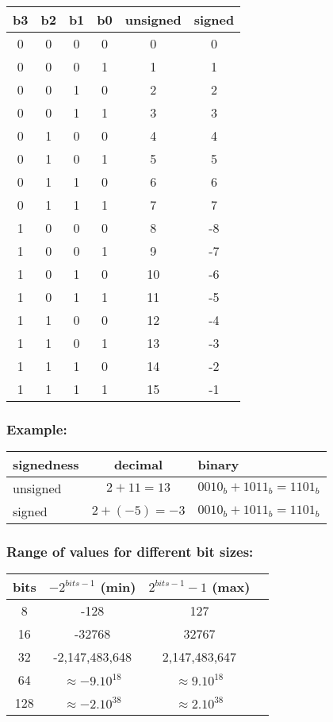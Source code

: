 \documentclass[12pt]{article}
\begin{document}
\begin{tabular}{cccccc}
b3 & b2 & b1 & b0 & unsigned & signed \\
\hline
0 & 0 & 0 & 0 & 0 & 0 \\
0 & 0 & 0 & 1 & 1 & 1 \\
0 & 0 & 1 & 0 & 2 & 2 \\
0 & 0 & 1 & 1 & 3 & 3 \\
0 & 1 & 0 & 0 & 4 & 4 \\
0 & 1 & 0 & 1 & 5 & 5 \\
0 & 1 & 1 & 0 & 6 & 6 \\
0 & 1 & 1 & 1 & 7 & 7 \\
1 & 0 & 0 & 0 & 8 & -8 \\
1 & 0 & 0 & 1 & 9 & -7 \\
1 & 0 & 1 & 0 & 10 & -6 \\
1 & 0 & 1 & 1 & 11 & -5 \\
1 & 1 & 0 & 0 & 12 & -4 \\
1 & 1 & 0 & 1 & 13 & -3 \\
1 & 1 & 1 & 0 & 14 & -2 \\
1 & 1 & 1 & 1 & 15 & -1 \\
\end{tabular}

\subsubsection{Example:}

\begin{tabular}{lcl}
signedness & decimal & binary \\
\hline
unsigned & $2 + 11 = 13$ & $0010_b + 1011_b = 1101_b$ \\
signed & $2 + (-5) = -3$ & $0010_b + 1011_b = 1101_b$ 
\end{tabular}

\subsubsection{Range of values for different bit sizes:}

\begin{tabular}{cccc}
bits & $-2^{bits-1}$ (min) & $2^{bits-1} - 1$ (max) \\
\hline
8  & -128 & 127 \\
16 & -32768 & 32767 \\
32 & -2,147,483,648 & 2,147,483,647 \\
64 & $\approx -9.10^{18}$ & $\approx 9.10^{18}$ \\
128 & $\approx -2.10^{38}$ & $\approx 2.10^{38}$ \\
\end{tabular}
\end{document}
